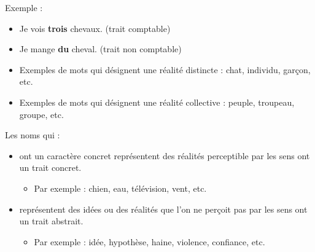 \documentclass[10pt, french]{article}
\begin{document}
\begin{multicols*}{2}
\begin{definitionNOHFILLpropos}
\begin{astuces}[Astuce]
Exemple :
\begin{itemize}
	\item	Je vois \textbf{trois} chevaux. (trait comptable)
	\item	Je mange \textbf{du} cheval. (trait non comptable)
\end{itemize}
\end{astuces}
\end{definitionNOHFILLpropos}

\begin{definitionNOHFILLpropos}
\begin{itemize}
	\item	Exemples de mots qui désignent une réalité distincte : chat, individu, garçon, etc.
	\item	Exemples de mots qui désignent une réalité collective : peuple, troupeau, groupe, etc.
\end{itemize}
\end{definitionNOHFILLpropos}

\begin{definitionNOHFILLpropos}
Les noms qui :
\begin{itemize}
	\item	ont un caractère concret représentent des réalités perceptible par les sens ont un trait  concret.
		\begin{itemize}
		\item	Par exemple : chien, eau, télévision, vent, etc.
		\end{itemize}
	\item	représentent des idées ou des réalités que l'on ne perçoit pas par les sens ont un trait abstrait.
		\begin{itemize}
		\item	Par exemple : idée, hypothèse, haine, violence, confiance, etc.
		\end{itemize}
\end{itemize}
\end{definitionNOHFILLpropos}



\end{multicols*}
\end{document}
